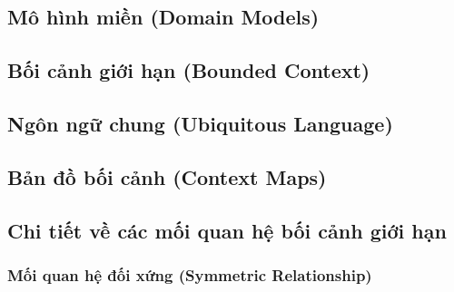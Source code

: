 \documentclass[oneside]{report} %
\begin{document}
% 



% 


% 

\subsection{Mô hình miền (Domain Models)}

% 

\subsection{Bối cảnh giới hạn (Bounded Context)}

% 

\subsection{Ngôn ngữ chung (Ubiquitous Language)}

% 

\subsection{Bản đồ bối cảnh (Context Maps)}

% 

\subsection{Chi tiết về các mối quan hệ bối cảnh giới hạn}

% 

\subsubsection{Mối quan hệ đối xứng (Symmetric Relationship)}
\end{document}
